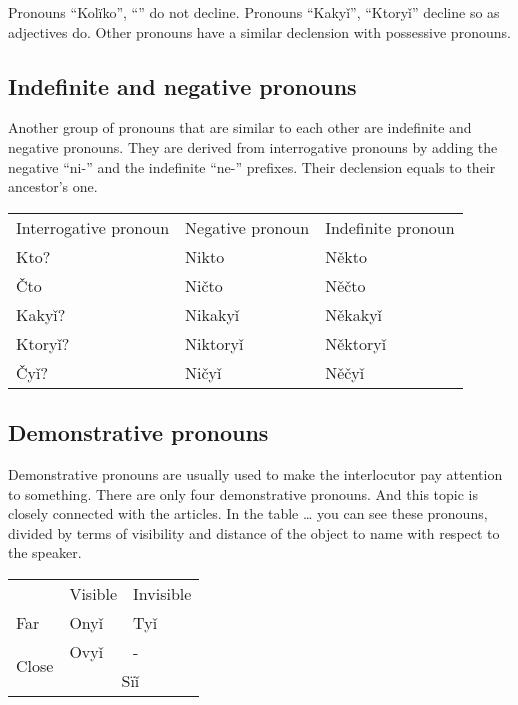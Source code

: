 Pronouns “Kolïko”, “” do not decline. Pronouns “Kakyǐ”, “Ktoryǐ” decline so as adjectives do. Other pronouns have a similar declension with possessive pronouns.
  
\subsection{Indefinite and negative pronouns}

Another group of pronouns that are similar to each other are indefinite and negative pronouns. They are derived from interrogative pronouns by adding the negative “ni-” and the indefinite “ne-” prefixes. Their declension equals to their ancestor’s one.

\begin{table}
	\begin{tabular}{lll}
		Interrogative pronoun & Negative pronoun & Indefinite pronoun \\
		Kto? & Nikto & Někto \\
		Čto & Ničto & Něčto \\
		Kakyǐ? & Nikakyǐ & Někakyǐ \\
		Ktoryǐ? & Niktoryǐ & Něktoryǐ \\
		Čyǐ? & Ničyǐ & Něčyǐ 
	\end{tabular}
\end{table}

\subsection{Demonstrative pronouns}

Demonstrative pronouns are usually used to make the interlocutor pay attention to something.
There are only four demonstrative pronouns. And this topic is closely connected with the articles. In the table … you can see these pronouns, divided by terms of visibility and distance of the object to name with respect to the speaker.


\begin{table}
	\begin{tabular}{lll}
		& Visible & Invisible \\
		Far & Onyǐ & Tyǐ \\
		\multirow{2}{*}{Close} & Ovyǐ & - \\ & \multicolumn{2}{c}{Sïǐ}  
	\end{tabular}
\end{table}

